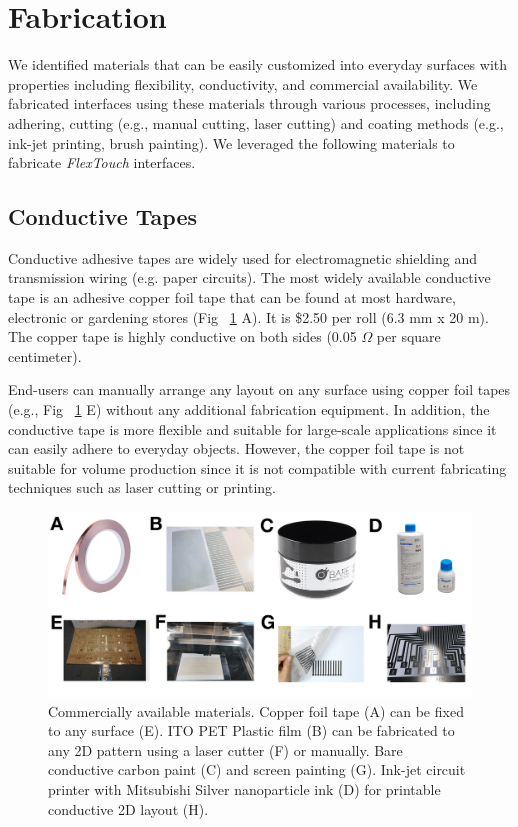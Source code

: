 \section{Fabrication}
We identified materials that can be easily customized into everyday surfaces with properties including flexibility, conductivity, and commercial availability. We fabricated interfaces using these materials through various processes, including adhering, cutting (e.g., manual cutting, laser cutting) and coating methods (e.g., ink-jet printing, brush painting). We leveraged the following materials to fabricate \textit{FlexTouch} interfaces.

\subsection{Conductive Tapes}
Conductive adhesive tapes are widely used for electromagnetic shielding and transmission wiring (e.g. paper circuits). The most widely available conductive tape is an adhesive copper foil tape that can be found at most hardware, electronic or gardening stores (Fig ~\ref{fig:material} A). It is \$2.50 per roll (6.3 mm x 20 m). The copper tape is highly conductive on both sides (0.05 $\Omega$ per square centimeter).

End-users can manually arrange any layout on any surface using copper foil tapes (e.g., Fig ~\ref{fig:material} E) without any additional fabrication equipment. In addition, the conductive tape is more flexible and suitable for large-scale applications since it can easily adhere to everyday objects. However, the copper foil tape is not suitable for volume production since it is not compatible with current fabricating techniques such as laser cutting or printing.

\begin{figure}
\centering
  \includegraphics[width=0.95\columnwidth]{figures/material.png}
  \setlength{\belowcaptionskip}{-6pt}
  \caption{Commercially available materials. Copper foil tape (A) can be fixed to any surface (E). ITO PET Plastic film (B) can be fabricated to any 2D pattern using a laser cutter (F) or manually. Bare conductive carbon paint (C) and screen painting (G). Ink-jet circuit printer with Mitsubishi Silver nanoparticle ink (D) for printable conductive 2D layout (H). }
  \label{fig:material}
\end{figure}

